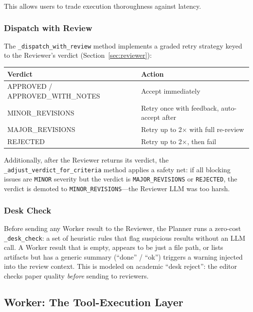 \documentclass[11pt,a4paper]{article}
\begin{document}
This allows users to trade execution thoroughness against latency.

\subsubsection*{Dispatch with Review}

The \texttt{\_dispatch\_with\_review} method implements a graded retry
strategy keyed to the Reviewer's verdict (Section~\ref{sec:reviewer}):

\begin{center}
\begin{tabular}{ll}
\toprule
\textbf{Verdict} & \textbf{Action} \\
\midrule
APPROVED / APPROVED\_WITH\_NOTES & Accept immediately \\
MINOR\_REVISIONS & Retry once with feedback, auto-accept after \\
MAJOR\_REVISIONS & Retry up to 2$\times$ with full re-review \\
REJECTED & Retry up to 2$\times$, then fail \\
\bottomrule
\end{tabular}
\end{center}

Additionally, after the Reviewer returns its verdict, the
\texttt{\_adjust\_verdict\_for\_criteria} method applies a safety net:
if all blocking issues are \texttt{MINOR} severity but the verdict is
\texttt{MAJOR\_REVISIONS} or \texttt{REJECTED}, the verdict is demoted to
\texttt{MINOR\_REVISIONS}---the Reviewer LLM was too harsh.

\subsubsection*{Desk Check}

Before sending any Worker result to the Reviewer, the Planner runs a
zero-cost \texttt{\_desk\_check}: a set of heuristic rules that flag
suspicious results without an LLM call. A Worker result that is empty,
appears to be just a file path, or lists artifacts but has a generic summary
(``done'' / ``ok'') triggers a warning injected into the review context.
This is modeled on academic ``desk reject'': the editor checks paper quality
\emph{before} sending to reviewers.

\subsection{Worker: The Tool-Execution Layer}
\label{sec:worker}
\end{document}
